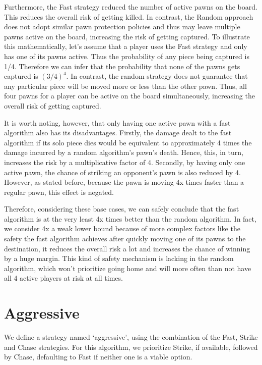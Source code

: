 \documentclass{article} %
\begin{document}
Furthermore, the Fast strategy reduced the number of active pawns on the board. This reduces the overall risk of getting killed. In contrast, the Random approach does not adopt similar pawn protection policies and thus may leave multiple pawns active on the board, increasing the risk of getting captured. To illustrate this mathematically, let's assume that a player uses the Fast strategy and only has one of its pawns active. Thus the probability of any piece being captured is 1/4. Therefore we can infer that the probability that none of the pawns gets captured is $(3/4)^4$. In contrast, the random strategy does not guarantee that any particular piece will be moved more or less than the other pawn. Thus, all four pawns for a player can be active on the board simultaneously, increasing the overall risk of getting captured.

It is worth noting, however, that only having one active pawn with a fast algorithm also has its disadvantages. Firstly, the damage dealt to the fast algorithm if its solo piece dies would be equivalent to approximately 4 times the damage incurred by a random algorithm’s pawn’s death. Hence, this, in turn, increases the risk by a multiplicative factor of 4. Secondly, by having only one active pawn, the chance of striking an opponent’s pawn is also reduced by 4. However, as stated before, because the pawn is moving 4x times faster than a regular pawn, this effect is negated.

Therefore, considering these base cases, we can safely conclude that the fast algorithm is at the very least 4x times better than the random algorithm. In fact, we consider 4x a weak lower bound because of more complex factors like the safety the fast algorithm achieves after quickly moving one of its pawns to the destination, it reduces the overall risk a lot and increases the chance of winning by a huge margin. This kind of safety mechanism is lacking in the random algorithm, which won’t prioritize going home and will more often than not have all 4 active players at risk at all times.

\section{Aggressive}
We define a strategy named ‘aggressive’, using the combination of the Fast, Strike and Chase strategies. For this algorithm, we prioritize Strike, if available, followed by Chase, defaulting to Fast if neither one is a viable option. 
\end{document}

